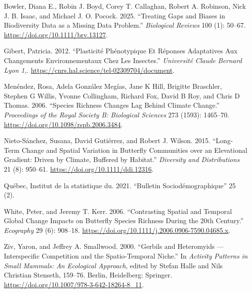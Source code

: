 \documentclass[9pt,twocolumn,twoside,]{pnas-new}
\newlength{\cslhangindent}
\newenvironment{CSLReferences}[2] %
 {\begin{list}{}{%
  \setlength{\itemindent}{0pt}
  \setlength{\leftmargin}{0pt}
  \setlength{\parsep}{0pt}
  \ifodd #1
   \setlength{\leftmargin}{\cslhangindent}
   \setlength{\itemindent}{-1\cslhangindent}
  \fi
  \setlength{\itemsep}{#2\baselineskip}}}
 {\end{list}}
\begin{document}
\label{refs}
\begin{CSLReferences}{1}{0}
Bowler, Diana E., Robin J. Boyd, Corey T. Callaghan, Robert A. Robinson,
Nick J. B. Isaac, and Michael J. O. Pocock. 2025. {``Treating Gaps and
Biases in Biodiversity Data as a Missing Data Problem.''}
\emph{Biological Reviews} 100 (1): 50--67.
\url{https://doi.org/10.1111/brv.13127}.

Gibert, Patricia. 2012. {``Plasticité Phénotypique Et Réponses
Adaptatives Aux Changements Environnementaux Chez Les Insectes.''}
\emph{Université Claude Bernard Lyon 1,}.
\url{https://cnrs.hal.science/tel-02309704/document}.

Menéndez, Rosa, Adela González Megías, Jane K Hill, Brigitte Braschler,
Stephen G Willis, Yvonne Collingham, Richard Fox, David B Roy, and Chris
D Thomas. 2006. {``Species Richness Changes Lag Behind Climate
Change.''} \emph{Proceedings of the Royal Society B: Biological
Sciences} 273 (1593): 1465--70.
\url{https://doi.org/10.1098/rspb.2006.3484}.

Nieto-Sánchez, Susana, David Gutiérrez, and Robert J. Wilson. 2015.
{``Long-Term Change and Spatial Variation in Butterfly Communities over
an Elevational Gradient: Driven by Climate, Buffered by Habitat.''}
\emph{Diversity and Distributions} 21 (8): 950--61.
\url{https://doi.org/10.1111/ddi.12316}.

Québec, Institut de la statistique du. 2021. {``Bulletin
Sociodémographique''} 25 (2).

White, Peter, and Jeremy T. Kerr. 2006. {``Contrasting Spatial and
Temporal Global Change Impacts on Butterfly Species Richness During the
20th Century.''} \emph{Ecography} 29 (6): 908--18.
\url{https://doi.org/10.1111/j.2006.0906-7590.04685.x}.

Ziv, Yaron, and Jeffrey A. Smallwood. 2000. {``Gerbils and {Heteromyids}
--- {Interspecific} {Competition} and the {Spatio}-{Temporal}
{Niche}.''} In \emph{Activity {Patterns} in {Small} {Mammals}: {An}
{Ecological} {Approach}}, edited by Stefan Halle and Nils Christian
Stenseth, 159--76. Berlin, Heidelberg: Springer.
\url{https://doi.org/10.1007/978-3-642-18264-8_11}.

\end{CSLReferences}



% 
\end{document}

